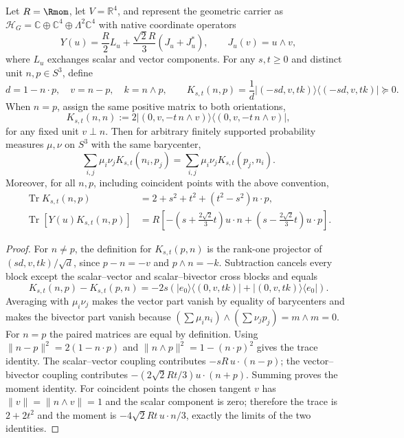 \documentclass[12pt,a4paper]{article}
\begin{document}
\begin{lemma}
\label{p2c:lem:universal-rank6-exterior-kernel}
Let $R=\Rmom$, let $V=\mathbb R^4$, and represent the geometric carrier
as $\mathcal H_G=\mathbb C\oplus\mathbb C^4\oplus\Lambda^2\mathbb C^4$
with native coordinate operators
\[
 Y(u)=\frac R2L_u+\frac{\sqrt2R}{3}(J_u+J_u^*),\qquad
 J_u(v)=u\wedge v,
\]
where $L_u$ exchanges scalar and vector components. For any $s,t\ge0$
and distinct unit $n,p\in S^3$, define
\[
 d=1-n\cdot p,\quad v=n-p,\quad k=n\wedge p,\qquad
 K_{s,t}(n,p)=\frac{1}{d}\big|(-sd,v,tk)\big\rangle
                      \big\langle(-sd,v,tk)\big|\succeq0.
\]
When $n=p$, assign the same positive matrix to both orientations,
\[
 K_{s,t}(n,n):=2\big|(0,v,-t\,n\wedge v)\big\rangle
                   \big\langle(0,v,-t\,n\wedge v)\big|,
\]
for any fixed unit $v\perp n$. Then for arbitrary finitely supported
probability measures $\mu,\nu$ on $S^3$ with the same barycenter,
\begin{equation}\label{p2c:eq:rank6-exterior-balance}
 \sum_{i,j}\mu_i\nu_j K_{s,t}(n_i,p_j)
 =\sum_{i,j}\mu_i\nu_j K_{s,t}(p_j,n_i).
\end{equation}
Moreover, for all $n,p$, including coincident points with the above
convention,
\begin{align}
 \operatorname{Tr}K_{s,t}(n,p)
 &=2+s^2+t^2+(t^2-s^2)n\cdot p,\label{p2c:eq:rank6-exterior-trace}\\
 \operatorname{Tr}[Y(u)K_{s,t}(n,p)]
 &=R\left[-\left(s+\frac{2\sqrt2}{3}t\right)u\cdot n
 +\left(s-\frac{2\sqrt2}{3}t\right)u\cdot p\right].
 \label{p2c:eq:rank6-exterior-moment}
\end{align}
\end{lemma}
\begin{proof}
For $n\ne p$, the definition for $K_{s,t}(p,n)$ is the rank-one
projector of $(sd,v,tk)/\sqrt d$, since $p-n=-v$ and
$p\wedge n=-k$. Subtraction cancels every block except the scalar--vector
and scalar--bivector cross blocks and equals
\[
 K_{s,t}(n,p)-K_{s,t}(p,n)
 =-2s\left(\lvert e_0\rangle\langle(0,v,tk)\rvert
           +\lvert(0,v,tk)\rangle\langle e_0\rvert\right).
\]
Averaging with $\mu_i\nu_j$ makes the vector part vanish by equality
of barycenters and makes the bivector part vanish because
$(\sum\mu_in_i)\wedge(\sum\nu_jp_j)=m\wedge m=0$.
For $n=p$ the paired matrices are equal by definition.
Using $\|n-p\|^2=2(1-n\cdot p)$ and
$\|n\wedge p\|^2=1-(n\cdot p)^2$ gives the trace identity.
The scalar--vector coupling contributes $-sR\,u\cdot(n-p)$;
the vector--bivector coupling contributes
$-(2\sqrt2Rt/3)u\cdot(n+p)$. Summing proves the moment identity.
For coincident points the chosen tangent $v$ has
$\|v\|=\|n\wedge v\|=1$ and the scalar component is zero;
therefore the trace is $2+2t^2$ and the moment is
$-4\sqrt2Rt\,u\cdot n/3$, exactly the limits of the two identities.
\end{proof}
\end{document}
